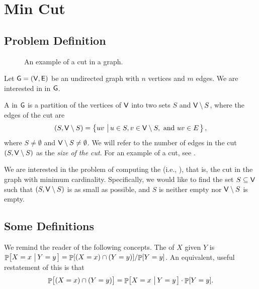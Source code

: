 \section{Min Cut}

\subsection{Problem Definition}



\begin{figure}[t]
    \centering
    \caption{An example of a cut in a graph.}
\end{figure}

Let $\mathsf{G}=(\mathsf{V}, \mathsf{E})$ be an undirected graph with $n$
vertices and $m$ edges.  We are interested in  in
$\mathsf{G}$.

\begin{defn}
    A  in $\mathsf{G}$ is a partition of the vertices of
    $\mathsf{V}$ into two sets $S$ and $\mathsf{V} \setminus S$,
    where the edges of the cut are
    \begin{equation*}
        (S, \Vertices \setminus S)%
        =%
        \brc{ uv \sep{ u \in S, v \in \Vertices \setminus S,
              \text{ and } uv \in E}},
    \end{equation*}
    where $S \neq \emptyset$ and $\mathsf{V} \setminus S \ne
    \emptyset$. We will refer to the number of edges in the cut
    $(S, \mathsf{V} \setminus S)$ as the \emph{size of the cut}.
    For an example of a cut, see .
\end{defn}


We are interested in the problem of computing the  (i.e., ), that is, the cut in the
graph with minimum cardinality.  Specifically, we would like to find
the set $S\subseteq \mathsf{V}$ such that $(S, \mathsf{V} \setminus S)$
is as small as possible, and $S$ is neither empty nor $\mathsf{V}
\setminus S$ is empty.



\subsection{Some Definitions}

We remind the reader of the following concepts.  The
 of $X$ given $Y$ is $ \Prob{X=x\sep{
      Y=y}} = \nfrac{\Prob{(X=x)\cap(Y=y)}}{\Prob{Y=y}}$.  An
equivalent, useful restatement of this is that
\begin{equation}
    \Prob{\bigl. (X=x)\cap(Y=y)} = \Prob{X=x\sep{ Y=y \MakeSBig }}
    \cdot \Prob{Y=y}.%
    \eqlab{conditional:probability}
\end{equation}

